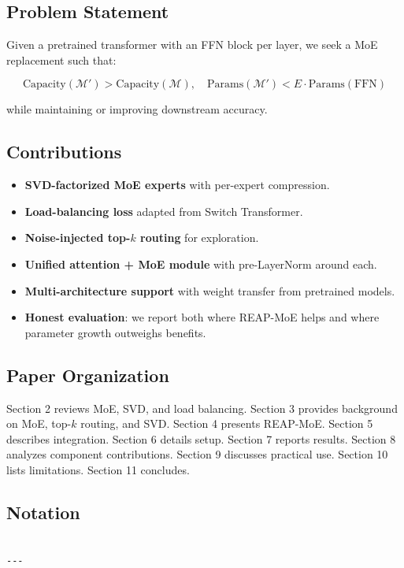 \subsection{Problem Statement}

Given a pretrained transformer with an FFN block per layer, we seek a MoE 
replacement such that:

\[
\text{Capacity}(\mathcal{M}') > \text{Capacity}(\mathcal{M}), \quad
\text{Params}(\mathcal{M}') < E \cdot \text{Params}(\text{FFN})
\tag{1.1}
\]

while maintaining or improving downstream accuracy.

\subsection{Contributions}

\begin{itemize}
\item \textbf{SVD-factorized MoE experts} with per-expert compression.
\item \textbf{Load-balancing loss} adapted from Switch Transformer.
\item \textbf{Noise-injected top-$k$ routing} for exploration.
\item \textbf{Unified attention + MoE module} with pre-LayerNorm around each.
\item \textbf{Multi-architecture support} with weight transfer from pretrained models.
\item \textbf{Honest evaluation}: we report both where REAP-MoE helps and where
  parameter growth outweighs benefits.

\end{itemize}
\subsection{Paper Organization}

Section 2 reviews MoE, SVD, and load balancing. Section 3 provides background 
on MoE, top-$k$ routing, and SVD. Section 4 presents REAP-MoE. Section 5 
describes integration. Section 6 details setup. Section 7 reports results. 
Section 8 analyzes component contributions. Section 9 discusses practical 
use. Section 10 lists limitations. Section 11 concludes.



\subsection{Notation}

\begin{lstlisting}

---
\end{lstlisting}